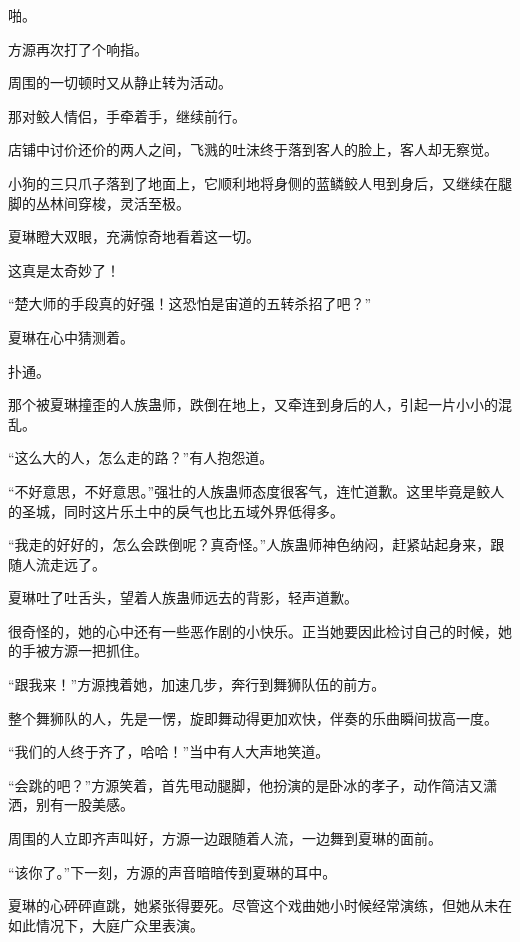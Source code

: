 
\begin{this_body}



啪。

方源再次打了个响指。

周围的一切顿时又从静止转为活动。

那对鲛人情侣，手牵着手，继续前行。

店铺中讨价还价的两人之间，飞溅的吐沫终于落到客人的脸上，客人却无察觉。

小狗的三只爪子落到了地面上，它顺利地将身侧的蓝鳞鲛人甩到身后，又继续在腿脚的丛林间穿梭，灵活至极。

夏琳瞪大双眼，充满惊奇地看着这一切。

这真是太奇妙了！

“楚大师的手段真的好强！这恐怕是宙道的五转杀招了吧？”

夏琳在心中猜测着。

扑通。

那个被夏琳撞歪的人族蛊师，跌倒在地上，又牵连到身后的人，引起一片小小的混乱。

“这么大的人，怎么走的路？”有人抱怨道。

“不好意思，不好意思。”强壮的人族蛊师态度很客气，连忙道歉。这里毕竟是鲛人的圣城，同时这片乐土中的戾气也比五域外界低得多。

“我走的好好的，怎么会跌倒呢？真奇怪。”人族蛊师神色纳闷，赶紧站起身来，跟随人流走远了。

夏琳吐了吐舌头，望着人族蛊师远去的背影，轻声道歉。

很奇怪的，她的心中还有一些恶作剧的小快乐。正当她要因此检讨自己的时候，她的手被方源一把抓住。

“跟我来！”方源拽着她，加速几步，奔行到舞狮队伍的前方。

整个舞狮队的人，先是一愣，旋即舞动得更加欢快，伴奏的乐曲瞬间拔高一度。

“我们的人终于齐了，哈哈！”当中有人大声地笑道。

“会跳的吧？”方源笑着，首先甩动腿脚，他扮演的是卧冰的孝子，动作简洁又潇洒，别有一股美感。

周围的人立即齐声叫好，方源一边跟随着人流，一边舞到夏琳的面前。

“该你了。”下一刻，方源的声音暗暗传到夏琳的耳中。

夏琳的心砰砰直跳，她紧张得要死。尽管这个戏曲她小时候经常演练，但她从未在如此情况下，大庭广众里表演。


\end{this_body}
